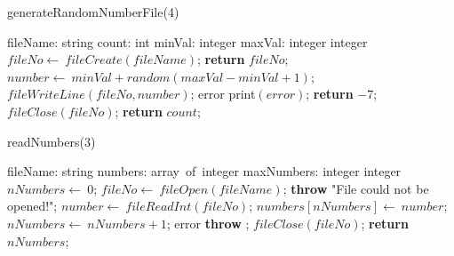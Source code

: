 \documentclass[a4paper,10pt]{article}
\begin{document}
\begin{algorithm}
\caption{generateRandomNumberFile(4)}
\begin{algorithmic}[5]
\State {}
\State {}
\State {}
\State {}
    \State fileName: string
    \State count: int
    \State minVal: integer
    \State maxVal: integer
  \EndDecl
    \State integer
  \EndDecl
  \State \(fileNo\gets\ fileCreate(fileName)\);
    \State \textbf{return} \(fileNo\);
  \EndIf
  \Try
      \State \(number\gets\ minVal+random(maxVal-minVal+1)\);
      \State \(fileWriteLine(fileNo,number)\);
    \EndFor
  \EndTry
  \Catch error
    \State \(\)print\((error)\);
    \State \textbf{return} \(-7\);
  \EndCatch %
  \Finally
    \State \(fileClose(fileNo)\);
  \EndFinally
  \State \textbf{return} \(count\);
\EndFunction
\end{algorithmic}
\end{algorithm}


\begin{algorithm}
\caption{readNumbers(3)}
\begin{algorithmic}[5]
\State {}
\State {}
\State {}
    \State fileName: string
    \State numbers: array\ of\ integer
    \State maxNumbers: integer
  \EndDecl
    \State integer
  \EndDecl
  \State \(nNumbers\gets\ 0\);
  \State \(fileNo\gets\ fileOpen(fileName)\);
    \State \textbf{throw} \(\)"{}File could not be opened!"{}\(\);
  \EndIf
  \Try
      \State \(number\gets\ fileReadInt(fileNo)\);
      \State \(numbers[nNumbers]\gets\ number\);
      \State \(nNumbers\gets\ nNumbers+1\);
    \EndWhile
  \EndTry
  \Catch error
    \State \textbf{throw} \(\);
  \EndCatch %
  \Finally
    \State \(fileClose(fileNo)\);
  \EndFinally
  \State \textbf{return} \(nNumbers\);
\EndFunction
\end{algorithmic}
\end{algorithm}
\end{document}
